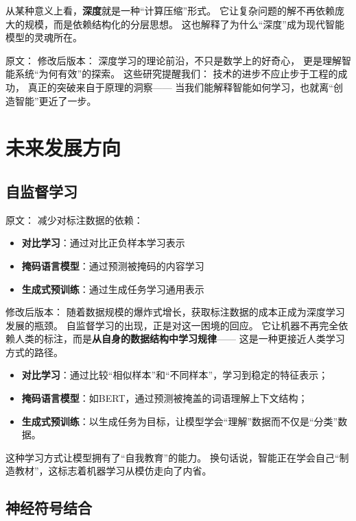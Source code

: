 从某种意义上看，\textbf{深度}就是一种“计算压缩”形式。  
它让复杂问题的解不再依赖庞大的规模，而是依赖结构化的分层思想。  
这也解释了为什么“深度”成为现代智能模型的灵魂所在。  



原文：
修改后版本：
深度学习的理论前沿，不只是数学上的好奇心，  
更是理解智能系统“为何有效”的探索。  
这些研究提醒我们：  
技术的进步不应止步于工程的成功，  
真正的突破来自于原理的洞察——  
当我们能解释智能如何学习，也就离“创造智能”更近了一步。

\section{未来发展方向}

\subsection{自监督学习}

原文：
减少对标注数据的依赖：

\begin{itemize}
\item \textbf{对比学习}：通过对比正负样本学习表示
\item \textbf{掩码语言模型}：通过预测被掩码的内容学习
\item \textbf{生成式预训练}：通过生成任务学习通用表示
\end{itemize}
修改后版本：
随着数据规模的爆炸式增长，获取标注数据的成本正成为深度学习发展的瓶颈。  
自监督学习的出现，正是对这一困境的回应。  
它让机器不再完全依赖人类的标注，而是\textbf{从自身的数据结构中学习规律}——  
这是一种更接近人类学习方式的路径。

\begin{itemize}
\item \textbf{对比学习}：通过比较“相似样本”和“不同样本”，学习到稳定的特征表示；
\item \textbf{掩码语言模型}：如BERT，通过预测被掩盖的词语理解上下文结构；
\item \textbf{生成式预训练}：以生成任务为目标，让模型学会“理解”数据而不仅是“分类”数据。
\end{itemize}

这种学习方式让模型拥有了“自我教育”的能力。  
换句话说，智能正在学会自己“制造教材”，这标志着机器学习从模仿走向了内省。



\subsection{神经符号结合}


